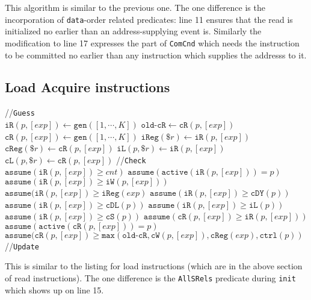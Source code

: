 \documentclass{article}
\newcommand{\var}{\texttt}
\begin{document}
This algorithm is similar to the previous one. The one difference is the incorporation of \var{data}-order related predicates: line 11 ensures that the read is initialized no earlier than an address-supplying event is. Similarly the modification to line 17 expresses the part of \var{ComCnd} which needs the instruction to be committed no earlier than any instruction which supplies the addresss to it.
\subsection{Load Acquire instructions}
\begin{algorithm}[H]
  \SetAlgoLined
  //\var{Guess}\\
  $\var{iR}(p,[exp]) \gets \var{gen}([1,\cdots,K])$\;
  $\var{old-cR} \gets \var{cR}(p,[exp])$\;
  $\var{cR}(p,[exp]) \gets \var{gen}([1,\cdots,K])$\;
  $\var{iReg}(\$r) \gets \var{iR}(p,[exp])$\;
  $\var{cReg}(\$r) \gets \var{cR}(p,[exp])$\;
  $\var{iL}(p,\$r) \gets \var{iR}(p,[exp])$\;
  $\var{cL}(p,\$r) \gets \var{cR}(p,[exp])$\;
  //\var{Check}\\
  $\var{assume}(\var{iR}(p,[exp]) \geq cnt)$\;
  $\var{assume}(\var{active}(\var{iR}(p,[exp])) = p)$\;
  $\var{assume}(\var{iR}(p,[exp]) \geq \var{iW}(p,[exp]))$\;
  $\var{assume}(\var{iR}(p,[exp]) \geq \var{iReg}(exp)$\;
  $\var{assume}(\var{iR}(p,[exp]) \geq \var{cDY}(p))$\;
  $\var{assume}(\var{iR}(p,[exp]) \geq \var{cDL}(p))$\;
  $\var{assume}(\var{iR}(p,[exp]) \geq \var{iL}(p))$\;
  $\var{assume}(\var{iR}(p,[exp]) \geq \var{cS}(p))$\;
  $\var{assume}(\var{cR}(p,[exp]) \geq \var{iR}(p,[exp]))$\;
  $\var{assume}(\var{active}(\var{cR}(p,[exp])) = p)$\;
  $\var{assume}(\var{cR}(p,[exp]) \geq \var{max}(\var{old-cR},\var{cW}(p,[exp]),\var{cReg}(exp),\var{ctrl}(p))$\;
  //\var{Update}\\
  \uIf{$\var{iR}(p,x) < \var{cW}(p,[exp])$}{
    $\$r \gets \nu(p,[exp])$\;
  }
  \Else{
    $\$r \gets \mu(x,\var{iR}(p,[exp]))$\;
  }
  \caption{$\llbracket \$r \leftarrow [exp]\rrbracket_K^{p,\var{LAcq}}$}
\end{algorithm}
This is similar to the listing for load instructions (which are in the above section of read instructions). The one difference is the \var{AllSRels} predicate during \var{init} which shows up on line 15.
\end{document}
